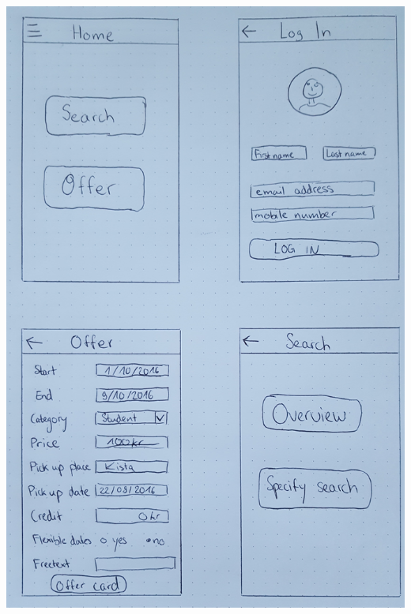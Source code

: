 \documentclass[11pt,twoside,a4paper]{report}
\begin{document}
\includegraphics[scale=0.06]{Paper_prototype1.jpg}\\
\end{document}
